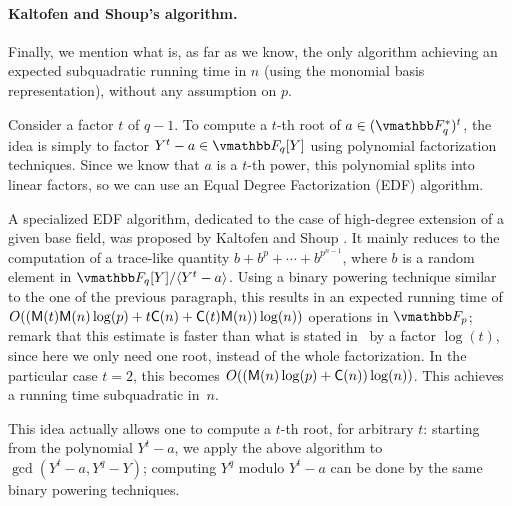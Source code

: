 \paragraph{Kaltofen and Shoup's algorithm.}
Finally, we mention what is, as far as we know, the only algorithm
achieving an expected subquadratic running time in $n$ (using the
monomial basis representation), without any assumption on $p$.

Consider a factor $t$ of $q-1$. To compute a $t$-th root of
$a\in(\F_q^*)^t$, the idea is simply to factor $Y^t - a \in \F_q[Y]$
using polynomial factorization techniques. Since we know that $a$ is a
$t$-th power, this polynomial splits into linear factors, so we
can use an Equal Degree Factorization (EDF) algorithm.

A specialized EDF algorithm, dedicated to the case of high-degree
extension of a given base field, was proposed by Kaltofen and Shoup
\cite{KaltofenShoup1997}. It mainly reduces to the computation of a
trace-like quantity $b+b^p + \cdots + b^{p^{n-1}}$, where $b$ is a
random element in $\F_q[Y]/\langle Y^t-a\rangle$. Using a binary
powering technique similar to the one of the previous paragraph, this
results in an expected running time of $O((\mathsf{M}(t)\mathsf{M}(n)\log(p) + t
\mathsf{C}(n) + \mathsf{C}(t)\mathsf{M}(n))\log(n))$ operations in $\F_p$; remark that this
estimate is faster than what is stated in~\cite{KaltofenShoup1997} by
a factor $\log(t)$, since here we only need one root, instead of the
whole factorization. In the particular case $t=2$, this becomes
$O((\mathsf{M}(n)\log(p) + \mathsf{C}(n))\log(n))$. This achieves a running time
subquadratic in~$n$.

This idea actually allows one to compute a $t$-th root, for arbitrary
$t$: starting from the polynomial $Y^t-a$, we apply the above
algorithm to $\gcd(Y^t-a, Y^q-Y)$; computing $Y^q$ modulo $Y^t-a$ can
be done by the same binary powering techniques.



